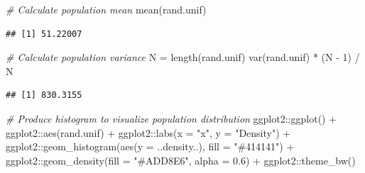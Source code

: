 \documentclass[
]{book}
\newenvironment{Shaded}{\begin{snugshade}}{\end{snugshade}}
\newcommand{\AttributeTok}[1]{\textcolor[rgb]{0.77,0.63,0.00}{#1}}
\newcommand{\CommentTok}[1]{\textcolor[rgb]{0.56,0.35,0.01}{\textit{#1}}}
\newcommand{\DecValTok}[1]{\textcolor[rgb]{0.00,0.00,0.81}{#1}}
\newcommand{\FloatTok}[1]{\textcolor[rgb]{0.00,0.00,0.81}{#1}}
\newcommand{\FunctionTok}[1]{\textcolor[rgb]{0.00,0.00,0.00}{#1}}
\newcommand{\NormalTok}[1]{#1}
\newcommand{\OtherTok}[1]{\textcolor[rgb]{0.56,0.35,0.01}{#1}}
\newcommand{\SpecialCharTok}[1]{\textcolor[rgb]{0.00,0.00,0.00}{#1}}
\newcommand{\StringTok}[1]{\textcolor[rgb]{0.31,0.60,0.02}{#1}}
\begin{document}
\begin{Shaded}
\begin{Highlighting}[]
\CommentTok{\# Calculate population mean}
\FunctionTok{mean}\NormalTok{(rand.unif)}
\end{Highlighting}
\end{Shaded}

\begin{verbatim}
## [1] 51.22007
\end{verbatim}

\begin{Shaded}
\begin{Highlighting}[]
\CommentTok{\# Calculate population variance}
\NormalTok{N }\OtherTok{=} \FunctionTok{length}\NormalTok{(rand.unif)}
\FunctionTok{var}\NormalTok{(rand.unif) }\SpecialCharTok{*}\NormalTok{ (N }\SpecialCharTok{{-}} \DecValTok{1}\NormalTok{) }\SpecialCharTok{/}\NormalTok{ N}
\end{Highlighting}
\end{Shaded}

\begin{verbatim}
## [1] 830.3155
\end{verbatim}

\begin{Shaded}
\begin{Highlighting}[]
\CommentTok{\# Produce histogram to visualize population distribution}
\NormalTok{ggplot2}\SpecialCharTok{::}\FunctionTok{ggplot}\NormalTok{() }\SpecialCharTok{+} 
\NormalTok{ggplot2}\SpecialCharTok{::}\FunctionTok{aes}\NormalTok{(rand.unif) }\SpecialCharTok{+} 
\NormalTok{ggplot2}\SpecialCharTok{::}\FunctionTok{labs}\NormalTok{(}\AttributeTok{x =} \StringTok{"x"}\NormalTok{, }\AttributeTok{y =} \StringTok{"Density"}\NormalTok{) }\SpecialCharTok{+} 
\NormalTok{ggplot2}\SpecialCharTok{::}\FunctionTok{geom\_histogram}\NormalTok{(}\FunctionTok{aes}\NormalTok{(}\AttributeTok{y =}\NormalTok{ ..density..), }\AttributeTok{fill =} \StringTok{"\#414141"}\NormalTok{) }\SpecialCharTok{+}
\NormalTok{ggplot2}\SpecialCharTok{::}\FunctionTok{geom\_density}\NormalTok{(}\AttributeTok{fill =} \StringTok{"\#ADD8E6"}\NormalTok{, }\AttributeTok{alpha =} \FloatTok{0.6}\NormalTok{) }\SpecialCharTok{+}
\NormalTok{ggplot2}\SpecialCharTok{::}\FunctionTok{theme\_bw}\NormalTok{()}
\end{Highlighting}
\end{Shaded}
\end{document}
